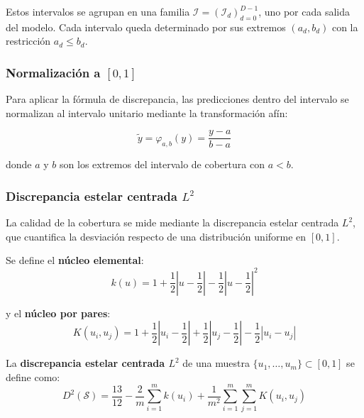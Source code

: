 \documentclass[12pt]{report} %
\begin{document}
Estos intervalos se agrupan en una familia $\boldsymbol{\mathcal{I}} = (\mathcal{I}_d)_{d=0}^{D-1}$, uno por cada salida del modelo. Cada intervalo queda determinado por sus extremos $(a_d, b_d)$ con la restricción $a_d \leq b_d$.

\subsubsection{Normalización a \texorpdfstring{$[0, 1]$}{[0, 1]}}

Para aplicar la fórmula de discrepancia, las predicciones dentro del intervalo se normalizan al intervalo unitario mediante la transformación afín:

\begin{equation}
    \tilde{y} = \varphi_{a,b}(y) = \frac{y - a}{b - a}
    \label{eq:formal_rescale}
\end{equation}

donde $a$ y $b$ son los extremos del intervalo de cobertura con $a < b$.

\subsubsection{Discrepancia estelar centrada \texorpdfstring{$L^2$}{L²}}

La calidad de la cobertura se mide mediante la discrepancia estelar centrada $L^2$, que cuantifica la desviación respecto de una distribución uniforme en $[0, 1]$.

Se define el \textbf{núcleo elemental}:
\begin{equation}
    k(u) = 1 + \frac{1}{2}\left|u - \frac{1}{2}\right| - \frac{1}{2}\left|u - \frac{1}{2}\right|^2
    \label{eq:formal_disc_kernel}
\end{equation}

y el \textbf{núcleo por pares}:
\begin{equation}
    K(u_i, u_j) = 1 + \frac{1}{2}\left|u_i - \frac{1}{2}\right| + \frac{1}{2}\left|u_j - \frac{1}{2}\right| - \frac{1}{2}|u_i - u_j|
    \label{eq:formal_pair_kernel}
\end{equation}

La \textbf{discrepancia estelar centrada $L^2$} de una muestra $\{u_1, \ldots, u_m\} \subset [0, 1]$ se define como:
\begin{equation}
    D^2(\mathcal{S}) = \frac{13}{12} - \frac{2}{m}\sum_{i=1}^{m} k(u_i) + \frac{1}{m^2}\sum_{i=1}^{m}\sum_{j=1}^{m} K(u_i, u_j)
    \label{eq:formal_discrepancy}
\end{equation}
\end{document}
